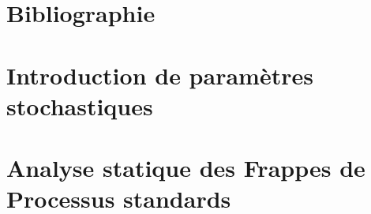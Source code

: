 \documentclass[fleqn,8pt,t]{beamer}
\begin{document}
\section[x]{Bibliographie}


\section{Introduction de paramètres stochastiques}




\section{Analyse statique des Frappes de Processus standards}



\setcounter{framenumber}{\value{finalframe}}
\end{document}
